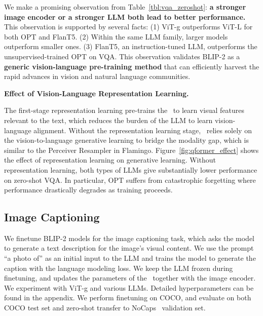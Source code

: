 We make a promising observation from Table~\ref{tbl:vqa_zeroshot}: 
\textbf{a stronger image encoder or a stronger LLM both lead to better performance.}
This observation is supported by several facts:
(1) ViT-g outperforms ViT-L for both OPT and FlanT5.
(2) Within the same LLM family, larger models outperform smaller ones.
(3) FlanT5, an instruction-tuned LLM, outperforms the unsupervised-trained OPT on VQA. 
This observation validates BLIP-2 as a \textbf{generic vision-language pre-training method} that can efficiently harvest the rapid advances in vision and natural language communities.  

\noindent\textbf{Effect of Vision-Language Representation Learning.}
\vspace{-0.5ex}


The first-stage representation learning pre-trains the \name~to learn visual features relevant to the text,
which reduces the burden of the LLM to learn vision-language alignment.
Without the representation learning stage,
\name~relies solely on the vision-to-language generative learning to bridge the modality gap, which is similar to the Perceiver Resampler in Flamingo.
Figure~\ref{fig:qformer_effect} shows the effect of representation learning on generative learning.
Without representation learning,
both types of LLMs give substantially lower performance on zero-shot VQA.
In particular, OPT suffers from catastrophic forgetting where performance drastically degrades as training proceeds.





\subsection{Image Captioning}

We finetune BLIP-2 models for the image captioning task,
which asks the model to generate a text description for the image's visual content.
We use the prompt ``a photo of'' as an initial input to the LLM and trains the model to generate the caption with the language modeling loss.
We keep the LLM frozen during finetuning, 
and updates the parameters of the \name~together with the image encoder.
We experiment with ViT-g and various LLMs.
Detailed hyperparameters can be found in the appendix.
We perform finetuning on COCO,
and evaluate on both COCO test set and zero-shot transfer to NoCaps~\cite{nocaps} validation set.

